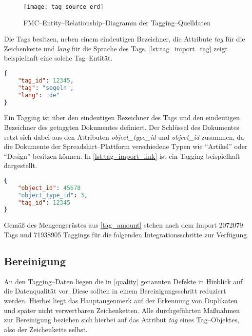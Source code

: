 \begin{figure}[h]
\centering
\texttt{[image: tag\_source\_erd]}
\caption{FMC--Entity--Relationship--Diagramm der Tagging--Quelldaten}
\label{fig:tag_source_erd}
\end{figure}

Die Tags besitzen, neben einem eindeutigen Bezeichner, die Attribute \emph{tag} für die Zeichenkette und \emph{lang} für die Sprache des Tags. \cref{lst:tag_import_tag} zeigt beispielhaft eine solche Tag--Entität.

\begin{lstlisting}[language=json, label={lst:tag_import_tag}, caption={JSON--Beispiel für einen importierten Tag}, float=h]
{
    "tag_id": 12345,
    "tag": "segeln",
    "lang": "de"
}
\end{lstlisting}

Ein Tagging ist über den eindeutigen Bezeichner des Tags und den eindeutigen Bezeichner des getaggten Dokumentes definiert. Der Schlüssel des Dokumentes setzt sich dabei aus den Attributen \emph{object\_type\_id} und \emph{object\_id} zusammen, da die Dokumente der Spreadshirt--Plattform verschiedene Typen wie  ``Artikel'' oder ``Design'' besitzen können. In \cref{lst:tag_import_link} ist ein Tagging beispielhaft dargestellt.

\begin{lstlisting}[language=json, label={lst:tag_import_link}, caption={JSON--Beispiel für ein importiertes Tagging}, float=ht]
{
    "object_id": 45678
    "object_type_id": 3,
    "tag_id": 12345
}
\end{lstlisting}

Gemäß des Mengengerüstes aus \cref{tag_amount} stehen nach dem Import \num{2072079} Tags und \num{71938905} Taggings für die folgenden Integrationsschritte zur Verfügung.

\subsection{Bereinigung}

An den Tagging--Daten liegen die in \cref{quality} genannten Defekte in Hinblick auf die Datenqualität vor. Diese sollten in einem Bereinigungsschritt reduziert werden. Hierbei liegt das Hauptaugenmerk auf der Erkennung von Duplikaten und später nicht verwertbaren Zeichenketten. Alle durchgeführten Maßnahmen zur Bereinigung beziehen sich hierbei auf das Attribut \emph{tag} eines Tag--Objektes, also der Zeichenkette selbst.

